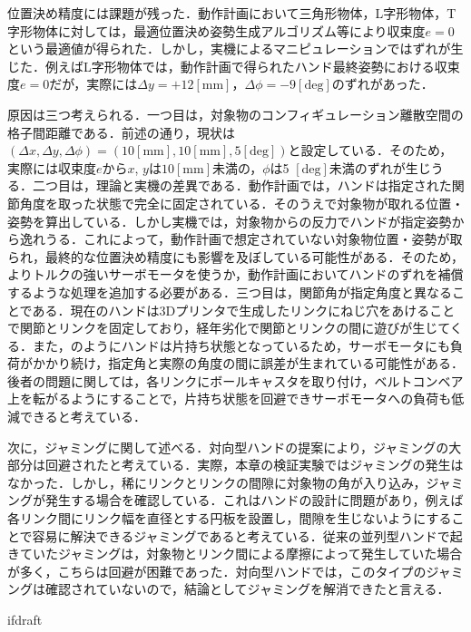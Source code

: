 \documentclass[a4paper,twoside,12pt,papersize, dvipdfmx]{iirthesis}
\begin{document}
位置決め精度には課題が残った．動作計画において三角形物体，L字形物体，T字形物体に対しては，最適位置決め姿勢生成アルゴリズム等により収束度$e=0$という最適値が得られた．しかし，実機によるマニピュレーションではずれが生じた．例えばL字形物体では，動作計画で得られたハンド最終姿勢における収束度$e=0$だが，実際には$\Delta y = +12 \mathrm{[mm]}$，$\Delta \phi = -9 \mathrm{[deg]}$のずれがあった．\par
原因は三つ考えられる．一つ目は，対象物のコンフィギュレーション離散空間の格子間距離である．前述の通り，現状は$(\Delta x, \Delta y, \Delta \phi) = (10 \mathrm{[mm]}, 10 \mathrm{[mm]}, 5 \mathrm{[deg]})$と設定している．そのため，実際には収束度$e$から$x$, $y$は$10 \mathrm{[mm]}$未満の，$\phi$は5 $\mathrm{[deg]}$未満のずれが生じうる．二つ目は，理論と実機の差異である．動作計画では，ハンドは指定された関節角度を取った状態で完全に固定されている．そのうえで対象物が取れる位置・姿勢を算出している．しかし実機では，対象物からの反力でハンドが指定姿勢から逸れうる．これによって，動作計画で想定されていない対象物位置・姿勢が取られ，最終的な位置決め精度にも影響を及ぼしている可能性がある．そのため，よりトルクの強いサーボモータを使うか，動作計画においてハンドのずれを補償するような処理を追加する必要がある．三つ目は，関節角が指定角度と異なることである．現在のハンドは3Dプリンタで生成したリンクにねじ穴をあけることで関節とリンクを固定しており，経年劣化で関節とリンクの間に遊びが生じてくる．また，のようにハンドは片持ち状態となっているため，サーボモータにも負荷がかかり続け，指定角と実際の角度の間に誤差が生まれている可能性がある．後者の問題に関しては，各リンクにボールキャスタを取り付け，ベルトコンベア上を転がるようにすることで，片持ち状態を回避できサーボモータへの負荷も低減できると考えている．\par


次に，ジャミングに関して述べる．対向型ハンドの提案により，ジャミングの大部分は回避されたと考えている．実際，本章の検証実験ではジャミングの発生はなかった．しかし，稀にリンクとリンクの間隙に対象物の角が入り込み，ジャミングが発生する場合を確認している．これはハンドの設計に問題があり，例えば各リンク間にリンク幅を直径とする円板を設置し，間隙を生じないようにすることで容易に解決できるジャミングであると考えている．従来の並列型ハンドで起きていたジャミングは，対象物とリンク間による摩擦によって発生していた場合が多く，こちらは回避が困難であった．対向型ハンドでは，このタイプのジャミングは確認されていないので，結論としてジャミングを解消できたと言える．




\expandafter\ifx\csname ifdraft\endcsname\relax
    
\end{document}
